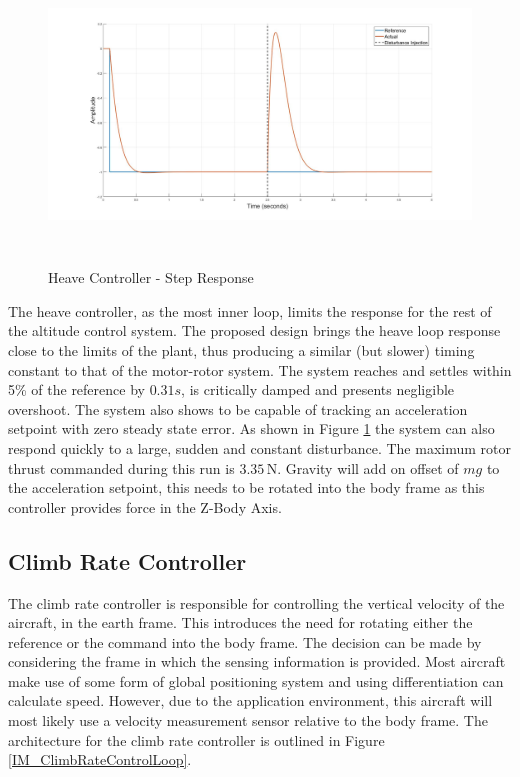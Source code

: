 		 \begin{figure}[H]
		 	\centering
		 	\includegraphics[height = 7.9cm]{../Design/Matlab/Controllers/heave_step.jpg}
		 	\caption{Heave Controller -  Step Response}
		 	\label{IM_HeaveStepDist}
		 \end{figure}
		 
		 The heave controller, as the most inner loop, limits the response for the rest of the altitude control system. The proposed design brings the heave loop response close to the limits of the plant, thus producing a similar (but slower) timing constant to that of the motor-rotor system. The system reaches and settles within 5\% of the reference by $0.31s$, is critically damped and presents negligible overshoot. The system also shows to be capable of tracking an acceleration setpoint with zero steady state error. As shown in Figure \ref{IM_HeaveStepDist} the system can also respond quickly to a large, sudden and constant disturbance. The maximum rotor thrust commanded during this run is $3.35$\,N. 
		 Gravity will add on offset of $mg$ to the acceleration setpoint, this needs to be rotated into the body frame as this controller provides force in the Z-Body Axis. 
	 
	 \subsection{Climb Rate Controller}
	 The climb rate controller is responsible for controlling the vertical velocity of the aircraft, in the earth frame. This introduces the need for rotating either the reference or the command into the body frame. The decision can be made by considering the frame in which the sensing information is provided. Most aircraft make use of some form of global positioning system and using differentiation can calculate speed. However, due to the application environment, this aircraft will most likely use a velocity measurement sensor relative to the body frame. The architecture for the climb rate controller is outlined in Figure \ref{IM_ClimbRateControlLoop}. 
	 
